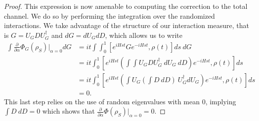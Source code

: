 \documentclass{article}
\newcommand{\parens}[1]{\left( #1 \right)}
\begin{document}
\begin{proof}
    This expression is now amenable to computing the correction to the total channel. We do so by performing the integration over the randomized interactions. We take advantage of the structure of our interaction measure, that is $G = U_G D U_G^\dagger$ and $dG = dU_G dD$, which allows us to write
    \begin{align}
        \int \frac{\partial}{\partial \alpha} \Phi_G(\rho_S) \bigg|_{\alpha = 0} dG &= it \int \int_0^1 \left[ e^{i H s t} G e^{-i H s t}, \rho(t) \right] ds ~dG \\
        &= it \int_0^1 \left[ e^{i H s t} \parens{\int \int U_G D U_G^\dagger ~dU_G ~ dD} e^{-i H s t}, \rho(t)  \right] ds \\
        &= i t \int_0^1 \left[ e^{i H s t} \parens{\int U_G \parens{\int D ~ dD} ~ U_G^\dagger dU_G } e^{-i H s t}, \rho(t) \right] ds \\
        &= 0.
    \end{align}
    This last step relies on the use of random eigenvalues with mean 0, implying $\int D ~dD = 0$ which shows that $\frac{\partial}{\partial \alpha} \Phi(\rho_S) \big|_{\alpha = 0 } = 0$.
\end{proof}
\end{document}

